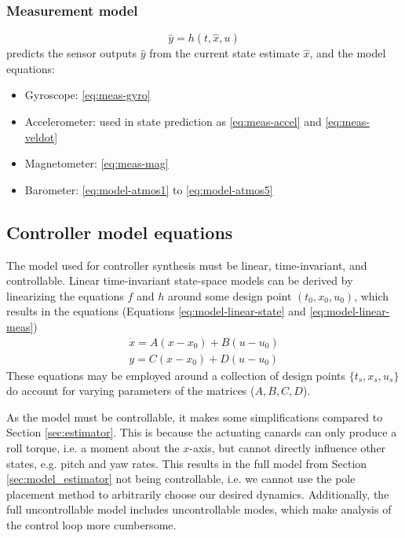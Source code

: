 \subsubsection{Measurement model} 
\begin{equation}
    \hat y = h(t, \hat x, u) \nonumber
\end{equation}
predicts the sensor outputs $\hat y$ from the current state estimate $\hat x$, and the model equations:
\begin{itemize}
    \item Gyroscope: \ref{eq:meas-gyro}
    \item Accelerometer: used in state prediction as \ref{eq:meas-accel} and \ref{eq:meas-veldot}
    \item Magnetometer: \ref{eq:meas-mag}
    \item Barometer: \ref{eq:model-atmos1} to \ref{eq:model-atmos5}
\end{itemize}

\subsection{Controller model equations}
\label{sec:model_controller}
The model used for controller synthesis must be linear, time-invariant, and controllable.
Linear time-invariant state-space models can be derived by linearizing the equations $f$ and $h$ around some design point $(t_0, x_0, u_0)$, which results in the equations (Equations \ref{eq:model-linear-state} and \ref{eq:model-linear-meas})
\begin{align}
    \dot x = A (x-x_0) + B (u-u_0) \nonumber \\
    y = C (x-x_0) + D (u-u_0) \nonumber
\end{align}
These equations may be employed around a collection of design points $\{ t_s, x_s, u_s \}$ do account for varying parameters of the matrices ($A,B,C,D$).

As the model must be controllable, it makes some simplifications compared to Section \ref{sec:estimator}.
This is because the actuating canards can only produce a roll torque, i.e. a moment about the $x$-axis, but cannot directly influence other states, e.g. pitch and yaw rates.
This results in the full model from Section \ref{sec:model_estimator} not being controllable, i.e. we cannot use the pole placement method to arbitrarily choose our desired dynamics.
Additionally, the full uncontrollable model includes uncontrollable modes, which make analysis of the control loop more cumbersome. 


